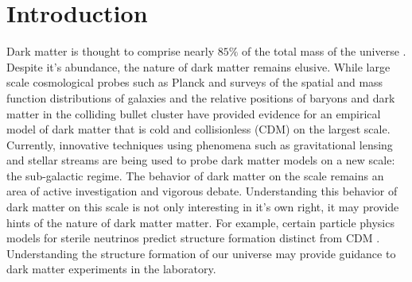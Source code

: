 \chapter{Introduction}\label{chap:intro}
 Dark matter is thought to comprise nearly $85\%$ of the total mass of the universe \cite{2020}. 
 Despite it's abundance, the nature of dark matter remains elusive.
 While large scale cosmological probes such as Planck \cite{2020} and surveys of the spatial and mass function distributions of galaxies \cite{white1978core,white1991galaxy,de2008high,weinberg2015cold} and the relative positions of baryons and dark matter in the colliding bullet cluster \cite{markevitch2004direct, randall2008constraints} have provided evidence for an empirical model of dark matter that is cold and collisionless (CDM) on the largest scale.  
 Currently, innovative techniques using phenomena such as gravitational lensing \citep[e.g.][]{vegetti2010detection, gilman2019warm, gilman2023constraining, minor2021unexpected} and stellar streams \cite[e.g.][]{bonaca2019spur, banik2021novel} are being used to probe dark matter models on a new scale: the sub-galactic regime.
 The behavior of dark matter on the scale remains an area of active investigation and vigorous debate. 
 Understanding this behavior of dark matter on this scale is not only interesting in it's own right, it may provide hints of the nature of dark matter matter. 
 For example, certain particle physics models for sterile neutrinos predict structure formation distinct from CDM \citep{dodelson1994sterile}.
 Understanding the structure formation of our universe may provide guidance to dark matter experiments in the laboratory. 

